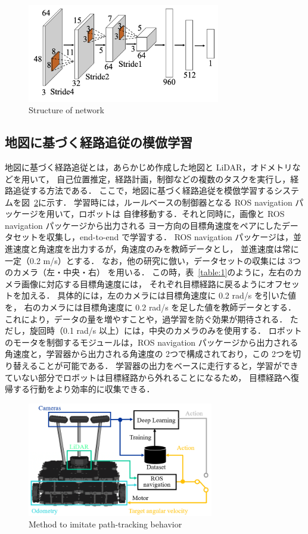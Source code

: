 \documentclass{jarticle}
\renewcommand{\figurename}{図~}
\renewcommand{\tablename}{表~}
\newcommand{\figref}[1]{\figurename\ref{#1}}
\newcommand{\tabref}[1]{\tablename\ref{#1}}
\begin{document}
\newpage

\begin{figure}[h!]
  \centering
   \includegraphics[height=43mm]{pdf/network.pdf}
   \caption{Structure of network}
   \label{fig:2}
\end{figure}


\subsection{地図に基づく経路追従の模倣学習}
地図に基づく経路追従とは，あらかじめ作成した地図と LiDAR，オドメトリなどを用いて，
自己位置推定，経路計画，制御などの複数のタスクを実行し，経路追従する方法である．
ここで，地図に基づく経路追従を模倣学習するシステムを\figref{fig:3}に示す．
学習時には，ルールベースの制御器となる ROS navigation パッケージ\cite{navigation}を用いて，ロボットは
自律移動する．それと同時に，画像と ROS navigation パッケージから出力される
ヨー方向の目標角速度をペアにしたデータセットを収集し，end-to-end で学習する．
ROS navigation パッケージは，並進速度と角速度を出力するが，角速度のみを教師データとし，
並進速度は常に一定（0.2 m/s）とする．
なお，他の研究\cite{Moridian}\cite{Bojarski}に倣い，データセットの収集には 3つのカメラ（左・中央・右）
を用いる．
この時，\tabref{table:1}のように，左右のカメラ画像に対応する目標角速度には，
それぞれ目標経路に戻るようにオフセットを加える．
具体的には，左のカメラには目標角速度に 0.2 rad/s を引いた値を，
右のカメラには目標角速度に 0.2 rad/s を足した値を教師データとする．
これにより，データの量を増やすことや，過学習を防ぐ効果が期待される．
ただし，旋回時（0.1 rad/s 以上）には，中央のカメラのみを使用する．
ロボットのモータを制御するモジュールは，ROS  navigation パッケージから出力される
角速度と，学習器から出力される角速度の 2つで構成されており，この 2つを切り替えることが可能である．
学習器の出力をベースに走行すると，学習ができていない部分でロボットは目標経路から外れることになるため，
目標経路へ復帰する行動をより効率的に収集できる．

\begin{figure}[h!]
  \centering
   \includegraphics[height=50mm]{./png/learn.png}
   \caption{Method to imitate path-tracking behavior}
   \label{fig:3}
\end{figure}
\end{document}
